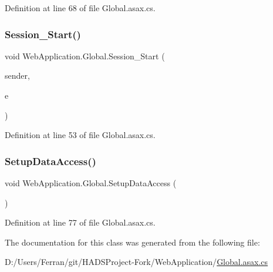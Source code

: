 Definition at line 68 of file Global.\+asax.\+cs.

\mbox{\label{classWebApplication_1_1Global_ab2e5cb6155c6759fc0d1a87d7df1668c}} 
\subsubsection{\texorpdfstring{Session\_Start()}{Session\_Start()}}
{\footnotesize\ttfamily void Web\+Application.\+Global.\+Session\+\_\+\+Start (\begin{DoxyParamCaption}\item[{object}]{sender,  }\item[{Event\+Args}]{e }\end{DoxyParamCaption})\hspace{0.3cm}{\ttfamily [protected]}}



Definition at line 53 of file Global.\+asax.\+cs.

\mbox{\label{classWebApplication_1_1Global_a51f7c694be3dcc6ebd0a1ed4d6b6c337}} 
\subsubsection{\texorpdfstring{SetupDataAccess()}{SetupDataAccess()}}
{\footnotesize\ttfamily void Web\+Application.\+Global.\+Setup\+Data\+Access (\begin{DoxyParamCaption}{ }\end{DoxyParamCaption})\hspace{0.3cm}{\ttfamily [protected]}}



Definition at line 77 of file Global.\+asax.\+cs.



The documentation for this class was generated from the following file\+:\begin{DoxyCompactItemize}
\item 
D\+:/\+Users/\+Ferran/git/\+H\+A\+D\+S\+Project-\/\+Fork/\+Web\+Application/\mbox{\hyperlink{Global_8asax_8cs}{Global.\+asax.\+cs}}\end{DoxyCompactItemize}
